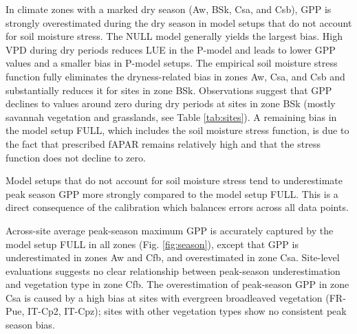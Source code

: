 \documentclass{myreport}
\begin{document}
In climate zones with a marked dry season (Aw, BSk, Csa, and Csb), GPP is strongly overestimated during the dry season in model setups that do not account for soil moisture stress. The NULL model generally yields the largest bias. High VPD during dry periods reduces LUE in the P-model and leads to lower GPP values and a smaller bias in P-model setups. The empirical soil moisture stress function fully eliminates the dryness-related bias in zones Aw, Csa, and Csb and substantially reduces it for sites in zone BSk. Observations suggest that GPP declines to values around zero during dry periods at sites in zone BSk (mostly savannah vegetation and grasslands, see Table \ref{tab:sites}). A remaining bias in the model setup FULL, which includes the soil moisture stress function, is due to the fact that prescribed fAPAR remains relatively high and that the stress function does not decline to zero.

Model setups that do not account for soil moisture stress tend to underestimate peak season GPP more strongly compared to the model setup FULL. This is a direct consequence of the calibration which balances errors across all data points.

Across-site average peak-season maximum GPP is accurately captured by the model setup FULL in all zones (Fig. \ref{fig:season}), except that GPP is underestimated in zones Aw and Cfb, and overestimated in zone Csa. Site-level evaluations suggests no clear relationship between peak-season underestimation and vegetation type in zone Cfb. The overestimation of peak-season GPP in zone Csa is caused by a high bias at sites with evergreen broadleaved vegetation (FR-Pue, IT-Cp2, IT-Cpz); sites with other vegetation types show no consistent peak season bias. 
\end{document}
